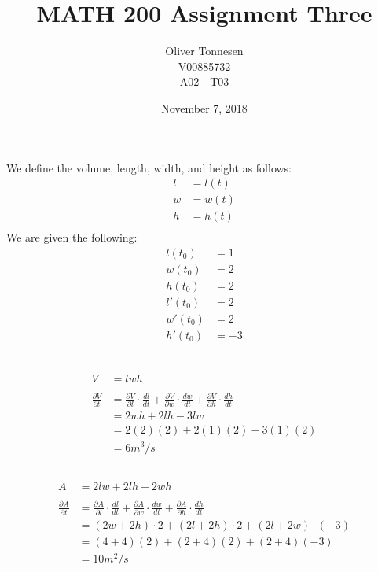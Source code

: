 \documentclass{article}
\title{MATH 200 Assignment Three}
\author{%
	Oliver Tonnesen\\
	V00885732\\
	A02 \-- T03}
\date{November 7, 2018}
\begin{document}
\maketitle
\renewcommand{\thesubsection}{\thesection.\alph{subsection}}
\section{} %
We define the volume, length, width, and height as follows:
\begin{align*}
	l&=l(t)\\
	w&=w(t)\\
	h&=h(t)\\
\end{align*}
We are given the following:
\begin{align*}
	l(t_0)&=1\\
	w(t_0)&=2\\
	h(t_0)&=2\\
	l'(t_0)&=2\\
	w'(t_0)&=2\\
	h'(t_0)&=-3\\
\end{align*}
\subsection{} %
\begin{align*}
	V&=lwh\\\\
	\frac{\partial{V}}{\partial{t}}
	&=\frac{\partial{V}}{\partial{l}}\cdot\frac{dl}{dt}
	+\frac{\partial{V}}{\partial{w}}\cdot\frac{dw}{dt}
	+\frac{\partial{V}}{\partial{h}}\cdot\frac{dh}{dt}\\
	&=2wh+2lh-3lw\\
	&=2(2)(2)+2(1)(2)-3(1)(2)\\
	&=6m^3/s
\end{align*}
\subsection{} %
\begin{align*}
	A&=2lw+2lh+2wh\\\\
	\frac{\partial{A}}{\partial{t}}
	&=\frac{\partial{A}}{\partial{l}}\cdot\frac{dl}{dt}
	+\frac{\partial{A}}{\partial{w}}\cdot\frac{dw}{dt}
	+\frac{\partial{A}}{\partial{h}}\cdot\frac{dh}{dt}\\
	&=(2w+2h)\cdot2+(2l+2h)\cdot2+(2l+2w)\cdot(-3)\\
	&=(4+4)(2)+(2+4)(2)+(2+4)(-3)\\
	&=10m^2/s
\end{align*}
\end{document}
